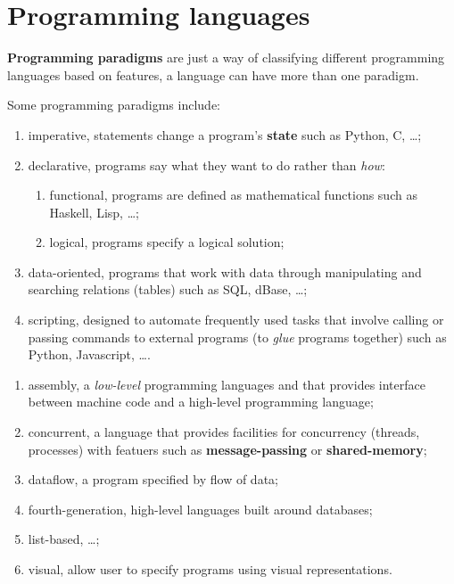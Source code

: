 \section{Programming languages}

\begin{definition}
    \textbf{Programming paradigms} are just a way of classifying different programming languages based on features, a language can have more than one paradigm.
\end{definition}


\begin{example}
    Some programming paradigms include:
    \begin{enumerate}
        \item imperative, statements change a program's \textbf{state} such as Python, C, \ldots;
        \item declarative, programs say what they want to do rather than \emph{how}:
        \begin{enumerate}
            \item functional, programs are defined as mathematical functions such as Haskell, Lisp, \ldots;
            \item logical, programs specify a logical solution;
        \end{enumerate}
        \item data-oriented, programs that work with data through manipulating and searching relations (tables) such as SQL, dBase, \ldots;
        \item scripting, designed to automate frequently used tasks that involve calling or passing commands to external programs (to \emph{glue} programs together) such as Python, Javascript, \ldots.
    \end{enumerate}
\end{example}

\begin{example}
    \begin{enumerate}
        Other, less common programming paradigms include:
        \item assembly, a \emph{low-level} programming languages and that provides interface between machine code and a high-level programming language;
        \item concurrent, a language that provides facilities for concurrency (threads, processes) with featuers such as \textbf{message-passing} or \textbf{shared-memory};
        \item dataflow, a program specified by flow of data;
        \item fourth-generation, high-level languages built around databases;
        \item list-based, \ldots;
        \item visual, allow user to specify programs using visual representations.
    \end{enumerate}
\end{example}


